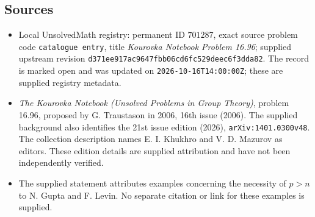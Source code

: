 \documentclass[11pt]{article}
\begin{document}
\subsection{Sources}
\begin{itemize}
\item Local UnsolvedMath registry: permanent ID \(701287\), exact source problem code \texttt{catalogue entry}, title \emph{Kourovka Notebook Problem 16.96}; supplied upstream revision \texttt{d371ee917ac9647fbb06cd6fc529deec6f3dda82}. The record is marked open and was updated on \texttt{2026-10-16T14:00:00Z}; these are supplied registry metadata.
\item \emph{The Kourovka Notebook (Unsolved Problems in Group Theory)}, problem 16.96, proposed by G. Traustason in 2006, 16th issue (2006). The supplied background also identifies the 21st issue edition (2026), \texttt{arXiv:1401.0300v48}. The collection description names E. I. Khukhro and V. D. Mazurov as editors. These edition details are supplied attribution and have not been independently verified.
\item The supplied statement attributes examples concerning the necessity of \(p>n\) to N. Gupta and F. Levin. No separate citation or link for these examples is supplied.
\end{itemize}
\end{document}
